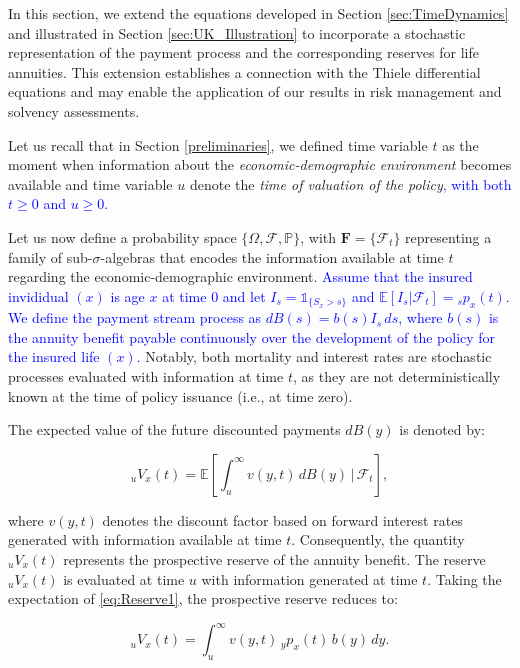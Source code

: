 \documentclass[12pt]{article}
\newcommand{\revision}[1]{\textcolor{blue}{#1}}
\begin{document}
In this section, we extend the equations developed in Section \ref{sec:TimeDynamics} and illustrated in Section \ref{sec:UK_Illustration} to incorporate a stochastic representation of the payment process and the corresponding reserves for life annuities. This extension establishes a connection with the Thiele differential equations and may enable the application of our results in risk management and solvency assessments.

Let us recall that in Section \ref{preliminaries}, we defined time variable \(t\) as the moment when information about the \textit{economic-demographic environment} becomes available and time variable \(u\) denote the \textit{time of valuation of the policy}\textcolor{blue}{, with both $t\ge0$ and $u\ge0$.}

Let us now define a probability space \( \{\Omega, \mathcal{F}, \mathbb{P}\} \), with \(\textbf{F} = \{\mathcal{F}_t\}\) representing a family of sub-\(\sigma\)-algebras that encodes the information available at time \( t \) regarding the economic-demographic environment. \revision{Assume that the insured invididual $(x)$ is age $x$ at time 0 and let \( I_{s} = \mathds{1}_{\{S_x > s\}} \) and \( \mathbb{E}[I_{s} | \mathcal{F}_t] = {}_s p_x(t) \). We define the payment stream process as \( dB(s) = b(s) I_{s} \, ds \), where \( b(s) \) is the annuity benefit payable continuously over the development of the policy for the insured life \( (x) \).}  Notably, both mortality and interest rates are stochastic processes evaluated with information at time \( t \), as they are not deterministically known at the time of policy issuance (i.e., at time zero). 

\color{blue}The expected value of the future discounted payments $dB(y)$ is denoted by:


\begin{equation}\label{eq:Reserve1}
	{}_uV_x(t) = \mathbb{E} \left[ \int_u^\infty v(y,t) \, dB(y) \,|\, \mathcal{F}_t \right],
\end{equation}

where \( v(y, t) \) denotes the discount factor based on forward interest rates generated with information available at time \( t \). Consequently, the quantity ${}_uV_x(t)$ represents the prospective reserve of the annuity benefit. The reserve ${}_uV_x(t)$ is evaluated at time $u$ with information generated at time $t$. Taking the expectation of \ref{eq:Reserve1}, the prospective reserve reduces to:

\begin{equation}\label{eq:Reserve2}
	{}_uV_x(t) = \int_u^\infty v(y,t) \, {}_yp_x(t) \, b(y) \, dy.
\end{equation}
\end{document}

